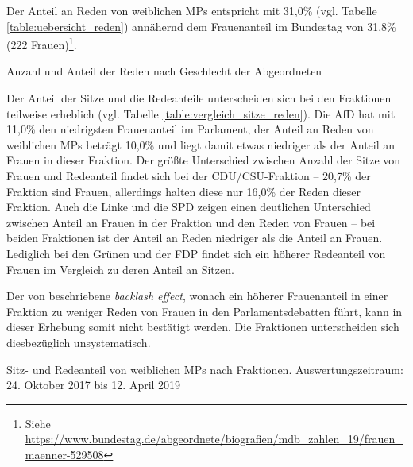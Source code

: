 \documentclass[12pt, 
    twoside=false, 
    bibliography=totoc, 
    numbers=endperiod, 
    headings=normal, 
    toc=chapterentrydotfill
    ]{scrbook}
\begin{document}
Der Anteil an Reden von weiblichen MPs entspricht mit 31,0\% (vgl. Tabelle \ref{table:uebersicht_reden}) annähernd dem Frauenanteil im Bundestag von 31,8\% (222 Frauen)\footnote{Siehe \url{https://www.bundestag.de/abgeordnete/biografien/mdb_zahlen_19/frauen_maenner-529508}}.

\begin{table}[htb]
    \centering
    \caption{Anzahl und Anteil der Reden nach Geschlecht der Abgeordneten}
    
    \label{table:uebersicht_reden}
\end{table}

Der Anteil der Sitze und die Redeanteile unterscheiden sich bei den Fraktionen teilweise erheblich (vgl. Tabelle \ref{table:vergleich_sitze_reden}). Die AfD hat mit 11,0\% den niedrigsten Frauenanteil im Parlament, der Anteil an Reden von weiblichen MPs beträgt 10,0\% und liegt damit etwas niedriger als der Anteil an Frauen in dieser Fraktion. 
Der größte Unterschied zwischen Anzahl der Sitze von Frauen und Redeanteil findet sich bei der CDU/CSU-Fraktion -- 20,7\% der Fraktion sind Frauen, allerdings halten diese nur 16,0\% der Reden dieser Fraktion. Auch die Linke und die SPD zeigen  einen deutlichen Unterschied zwischen Anteil an Frauen in der Fraktion und den Reden von Frauen -- bei beiden Fraktionen ist der Anteil an Reden niedriger als die Anteil an Frauen. Lediglich bei den Grünen und der FDP findet sich ein höherer Redeanteil von Frauen im Vergleich zu deren Anteil an Sitzen.

Der von \textcite{back_2018} beschriebene \emph{backlash effect}, wonach ein höherer Frauenanteil in einer Fraktion zu weniger Reden von Frauen in den Parlamentsdebatten führt, kann in dieser Erhebung somit nicht bestätigt werden. Die Fraktionen unterscheiden sich diesbezüglich unsystematisch.

\begin{table}[htb]
    \centering
    \caption[Sitz- und Redeanteil von weiblichen MPs nach Fraktionen]{Sitz- und Redeanteil von weiblichen MPs nach Fraktionen. Auswertungszeitraum: 24. Oktober 2017 bis 12. April 2019}
    
    \label{table:vergleich_sitze_reden}
\end{table}
\end{document}

